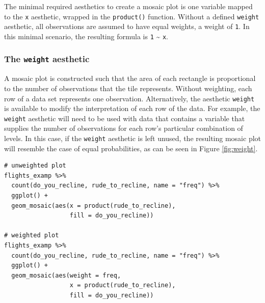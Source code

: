 The minimal required aesthetics to create a mosaic plot is one variable mapped to the \texttt{x} aesthetic, wrapped in the \texttt{product()} function. Without a defined \texttt{weight} aesthetic, all observations are assumed to have equal weights, a weight of \texttt{1}. In this minimal scenario, the resulting formula is \texttt{1} \textasciitilde{} \texttt{x}.

\hypertarget{the-weight-aesthetic}{%
\subsubsection{\texorpdfstring{The \texttt{weight} aesthetic}{The weight aesthetic}}\label{the-weight-aesthetic}}

A mosaic plot is constructed such that the area of each rectangle is proportional to the number of observations that the tile represents. Without weighting, each row of a data set represents one observation. Alternatively, the aesthetic \texttt{weight} is available to modify the interpretation of each row of the data. For example, the \texttt{weight} aesthetic will need to be used with data that contains a variable that supplies the number of observations for each row's particular combination of levels. In this case, if the \texttt{weight} aesthetic is left unused, the resulting mosaic plot will resemble the case of equal probabilities, as can be seen in Figure \ref{fig:weight}.

\begin{verbatim}
# unweighted plot
flights_examp %>%
  count(do_you_recline, rude_to_recline, name = "freq") %>%
  ggplot() +
  geom_mosaic(aes(x = product(rude_to_recline), 
                  fill = do_you_recline))

# weighted plot
flights_examp %>%
  count(do_you_recline, rude_to_recline, name = "freq") %>%
  ggplot() +
  geom_mosaic(aes(weight = freq, 
                  x = product(rude_to_recline), 
                  fill = do_you_recline))
\end{verbatim}

